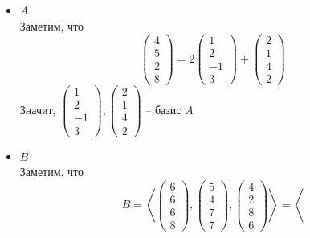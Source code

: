 \begin{itemize}
	\item $ A $ \\
    Заметим, что
    $$
    \begin{pmatrix}
    	4 \\
        5 \\
        2 \\
        8
    \end{pmatrix} = 2
    \begin{pmatrix}
    	1 \\
        2 \\
        -1 \\
        3
    \end{pmatrix} +
    \begin{pmatrix}
    	2 \\
        1 \\
        4 \\
        2
    \end{pmatrix} $$
    Значит, $
    \begin{pmatrix}
    	1 \\
        2 \\
        -1 \\
        3
    \end{pmatrix},
    \begin{pmatrix}
    	2 \\
        1 \\
        4 \\
        2
    \end{pmatrix} $ -- базис $ A $
    \item $ B $ \\
    Заметим, что
    $$ B = \left\langle
    \begin{pmatrix}
        6 \\
        6 \\
        6 \\
        8
    \end{pmatrix},
    \begin{pmatrix}
        5 \\
        4 \\
        7 \\
        7
    \end{pmatrix},
    \begin{pmatrix}
        4 \\
        2 \\
        8 \\
        6
    \end{pmatrix} \right\rangle = \left\langle
$$
\end{itemize}
